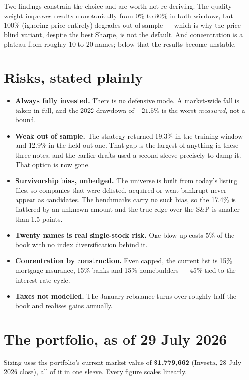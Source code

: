 \documentclass[11pt,a4paper]{article}
\begin{document}
Two findings constrain the choice and are worth not re-deriving. The quality
weight improves results monotonically from 0\% to 80\% in both windows, but
100\% (ignoring price entirely) degrades out of sample --- which is why the
price-blind variant, despite the best Sharpe, is not the default. And
concentration is a plateau from roughly 10 to 20 names; below that the results
become unstable.

\section{Risks, stated plainly}

\begin{itemize}[leftmargin=1.4em,itemsep=0.3em]
  \item \textbf{Always fully invested.} There is no defensive mode. A
  market-wide fall is taken in full, and the 2022 drawdown of $-21.5\%$ is the
  worst \emph{measured}, not a bound.
  \item \textbf{Weak out of sample.} The strategy returned 19.3\% in the
  training window and 12.9\% in the held-out one. That gap is the largest of
  anything in these three notes, and the earlier drafts used a second sleeve
  precisely to damp it. That option is now gone.
  \item \textbf{Survivorship bias, unhedged.} The universe is built from
  today's listing files, so companies that were delisted, acquired or went
  bankrupt never appear as candidates. The benchmarks carry no such bias, so
  the 17.4\% is flattered by an unknown amount and the true edge over the S\&P
  is smaller than 1.5 points.
  \item \textbf{Twenty names is real single-stock risk.} One blow-up costs 5\%
  of the book with no index diversification behind it.
  \item \textbf{Concentration by construction.} Even capped, the current list
  is 15\% mortgage insurance, 15\% banks and 15\% homebuilders --- 45\% tied
  to the interest-rate cycle.
  \item \textbf{Taxes not modelled.} The January rebalance turns over roughly
  half the book and realises gains annually.
\end{itemize}

\section{The portfolio, as of 29 July 2026}\label{sec:portfolio}

Sizing uses the portfolio's current market value of \textbf{\$1{,}779{,}662}
(Investa, 28 July 2026 close), all of it in one sleeve. Every figure scales
linearly.
\end{document}

